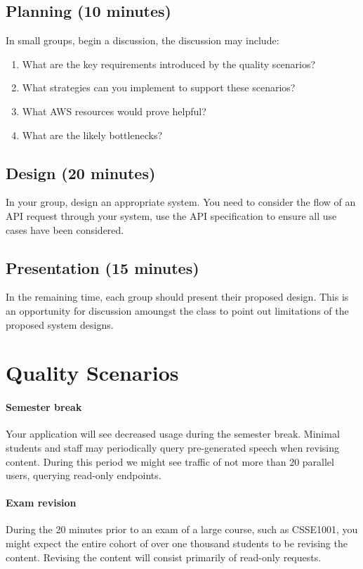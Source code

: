 \documentclass{csse4400}
\begin{document}
\subsection*{Planning (10 minutes)}
In small groups, begin a discussion,
the discussion may include:

\begin{enumerate}
    \item What are the key requirements introduced by the quality scenarios?
    \item What strategies can you implement to support these scenarios?
    \item What AWS resources would prove helpful?
    \item What are the likely bottlenecks?
\end{enumerate}

\subsection*{Design (20 minutes)}

In your group, design an appropriate system.
You need to consider the flow of an API request through your system,
use the API specification to ensure all use cases have been considered.

\subsection*{Presentation (15 minutes)}

In the remaining time,
each group should present their proposed design.
This is an opportunity for discussion amoungst the class to point out limitations of the proposed system designs.

\section{Quality Scenarios}\label{sec:scenarios}

\paragraph{Semester break}
Your application will see decreased usage during the semester break.
Minimal students and staff may periodically query pre-generated speech when revising content.
During this period we might see traffic of not more than 20 parallel users,
querying read-only endpoints.

\paragraph{Exam revision}
During the 20 minutes prior to an exam of a large course, such as CSSE1001,
you might expect the entire cohort of over one thousand students to be revising the content.
Revising the content will consist primarily of read-only requests.
\end{document}
